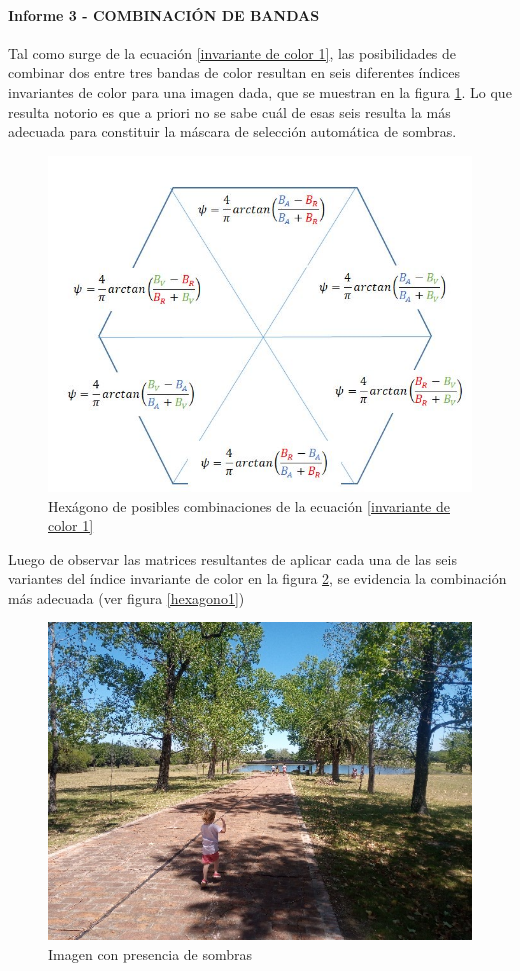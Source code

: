  

\paragraph{Informe 3 - COMBINACIÓN DE BANDAS}

Tal como surge de la ecuación \ref{invariante de color 1}, las posibilidades de combinar dos entre tres bandas de color resultan en seis diferentes índices invariantes de color para una imagen dada, que se muestran en la figura \ref{hexagono}. Lo que resulta notorio es que a priori no se sabe cuál de esas seis resulta la más adecuada para constituir la máscara de selección automática de sombras. 

\begin{figure}[H]
    \centering
    \includegraphics[width=0.5\linewidth]{Imagenes//Comparativo Homo-IIC/hexagono.JPG}
    \caption{Hexágono de posibles combinaciones de la ecuación \ref{invariante de color 1}}
    \label{hexagono}
\end{figure}

Luego de observar las matrices resultantes de aplicar cada una de las seis variantes del índice invariante de color en la figura \ref{sanjose}, se evidencia la combinación más adecuada (ver figura \ref{hexagono1})

\begin{figure}[H]
    \centering
    \includegraphics[width=0.5\linewidth]{Imagenes//Informes/info3_sanjose.JPG}
    \caption{Imagen con presencia de sombras }
    \label{sanjose}
\end{figure}

